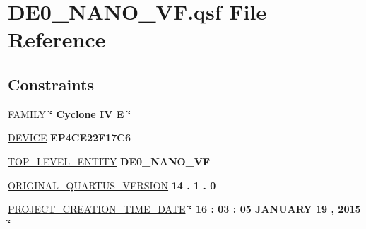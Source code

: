 \hypertarget{_d_e0___n_a_n_o___v_f_8qsf}{}\section{D\+E0\+\_\+\+N\+A\+N\+O\+\_\+\+V\+F.\+qsf File Reference}
\label{_d_e0___n_a_n_o___v_f_8qsf}
\subsection*{Constraints}
 \begin{DoxyCompactItemize}
\item 
\hyperlink{_d_e0___n_a_n_o___v_f_8qsf_ab231a1c4706957244c918356f65cfec8}{F\+A\+M\+I\+L\+Y} {\bfseries \textcolor{vhdlchar}{\char`\"{}}\textcolor{vhdlchar}{ }\textcolor{vhdlchar}{Cyclone}\textcolor{vhdlchar}{ }\textcolor{vhdlchar}{I\+V}\textcolor{vhdlchar}{ }\textcolor{vhdlchar}{E}\textcolor{vhdlchar}{ }\textcolor{vhdlchar}{\char`\"{}}\textcolor{vhdlchar}{ }} 
\item 
\hyperlink{_d_e0___n_a_n_o___v_f_8qsf_a430498eb59a90f64a3df65642194cb5a}{D\+E\+V\+I\+C\+E} {\bfseries \textcolor{vhdlchar}{E\+P4\+C\+E22\+F17\+C6}\textcolor{vhdlchar}{ }} 
\item 
\hyperlink{_d_e0___n_a_n_o___v_f_8qsf_a1029cf591523124c2eccd157bd2833da}{T\+O\+P\+\_\+\+L\+E\+V\+E\+L\+\_\+\+E\+N\+T\+I\+T\+Y} {\bfseries \textcolor{vhdlchar}{D\+E0\+\_\+\+N\+A\+N\+O\+\_\+\+V\+F}\textcolor{vhdlchar}{ }} 
\item 
\hyperlink{_d_e0___n_a_n_o___v_f_8qsf_acd9cab3490a4efd08533ef667b2e65d1}{O\+R\+I\+G\+I\+N\+A\+L\+\_\+\+Q\+U\+A\+R\+T\+U\+S\+\_\+\+V\+E\+R\+S\+I\+O\+N} {\bfseries  \textcolor{vhdldigit}{14} \textcolor{vhdlchar}{.} \textcolor{vhdldigit}{1} \textcolor{vhdlchar}{.} \textcolor{vhdldigit}{0} \textcolor{vhdlchar}{ }} 
\item 
\hyperlink{_d_e0___n_a_n_o___v_f_8qsf_a7aa35954da0d8611b398f9c1e2d18507}{P\+R\+O\+J\+E\+C\+T\+\_\+\+C\+R\+E\+A\+T\+I\+O\+N\+\_\+\+T\+I\+M\+E\+\_\+\+D\+A\+T\+E} {\bfseries \textcolor{vhdlchar}{\char`\"{}}\textcolor{vhdlchar}{ } \textcolor{vhdldigit}{16} \textcolor{vhdlchar}{ }\textcolor{vhdlchar}{\+:}\textcolor{vhdlchar}{ } \textcolor{vhdldigit}{03} \textcolor{vhdlchar}{ }\textcolor{vhdlchar}{\+:}\textcolor{vhdlchar}{ } \textcolor{vhdldigit}{05} \textcolor{vhdlchar}{ }\textcolor{vhdlchar}{ }\textcolor{vhdlchar}{J\+A\+N\+U\+A\+R\+Y}\textcolor{vhdlchar}{ } \textcolor{vhdldigit}{19} \textcolor{vhdlchar}{ }\textcolor{vhdlchar}{,}\textcolor{vhdlchar}{ }\textcolor{vhdlchar}{ } \textcolor{vhdldigit}{2015} \textcolor{vhdlchar}{ }\textcolor{vhdlchar}{\char`\"{}}\textcolor{vhdlchar}{ }} 

\end{DoxyCompactItemize}
